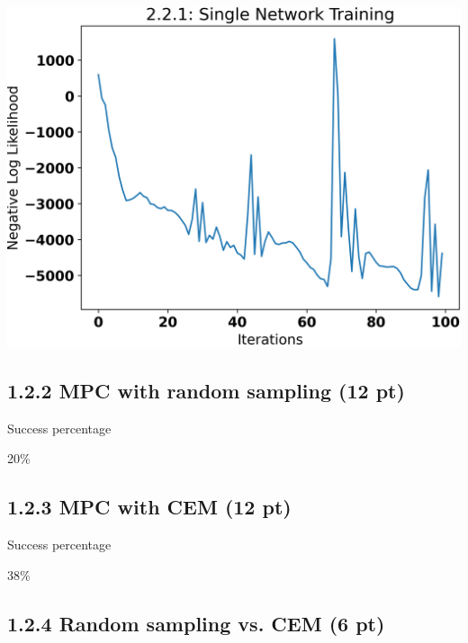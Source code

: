 \documentclass[12pt]{article}
\begin{document}
\begin{tcolorbox}[fit,height=30em, width=40em, blank, borderline={1pt}{1pt},nobeforeafter]
\begin{center}
    \includegraphics[width=40em]{2.2.1-loss}
\end{center}
\end{tcolorbox}

\subsection*{1.2.2 MPC with random sampling (12 pt)}

Success percentage
\begin{tcolorbox}[fit,height=1cm, width=5cm, blank, borderline={1pt}{1pt},nobeforeafter]
\begin{center}
    20\%
\end{center}
\end{tcolorbox}

\subsection*{1.2.3 MPC with CEM (12 pt)}

Success percentage
\begin{tcolorbox}[fit,height=1cm, width=5cm, blank, borderline={1pt}{1pt},nobeforeafter]
\begin{center}
    38\%
\end{center}
\end{tcolorbox}

\subsection*{1.2.4 Random sampling vs. CEM  (6 pt)}
\end{document}
